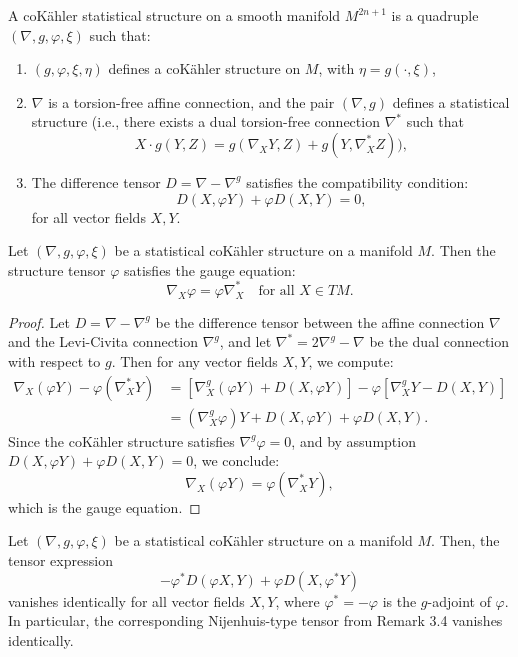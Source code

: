 \begin{defn}
A coKähler statistical structure on a smooth manifold $M^{2n+1}$ is a quadruple $(\nabla, g, \varphi, \xi)$ such that:
\begin{enumerate}
    \item \((g, \varphi, \xi, \eta)\) defines a coKähler structure on \(M\), with \(\eta = g(\cdot, \xi)\),
    \item \(\nabla\) is a torsion-free affine connection, and the pair \((\nabla, g)\) defines a statistical structure (i.e., there exists a dual torsion-free connection \(\nabla^*\) such that
    \[
    X \cdot g(Y, Z) = g(\nabla_X Y, Z) + g(Y, \nabla^*_X Z)),
    \]
    \item The difference tensor \(D = \nabla - \nabla^{g}\) satisfies the compatibility condition:
    \[
    D(X, \varphi Y) + \varphi D(X, Y) = 0,
    \]
    for all vector fields \(X, Y\).
\end{enumerate}
\end{defn}
\begin{prop}
Let \((\nabla, g, \varphi, \xi)\) be a statistical coKähler structure on a manifold \(M\).
Then the structure tensor \(\varphi\) satisfies the gauge equation:
\[
\nabla_X \varphi = \varphi \nabla^*_X \quad \text{for all } X \in TM.
\]
\end{prop}
\begin{proof}
Let \(D = \nabla - \nabla^{g}\) be the difference tensor between the affine connection \(\nabla\) and the Levi-Civita connection \(\nabla^{g}\), and let \(\nabla^* = 2\nabla^{g} - \nabla\) be the dual connection with respect to \(g\). Then for any vector fields \(X, Y\), we compute:
\[
\begin{aligned}
\nabla_X(\varphi Y) - \varphi(\nabla^*_X Y)
&= \left[\nabla^{g}_X(\varphi Y) + D(X, \varphi Y)\right] - \varphi\left[\nabla^{g}_X Y - D(X, Y)\right] \\
&= (\nabla^{g}_X \varphi)Y + D(X, \varphi Y) + \varphi D(X, Y).
\end{aligned}
\]
Since the coKähler structure satisfies \(\nabla^{g} \varphi = 0\), and by assumption \(D(X, \varphi Y) + \varphi D(X, Y) = 0\), we conclude:
\[
\nabla_X(\varphi Y) = \varphi(\nabla^*_X Y),
\]
which is the gauge equation.
\end{proof}
\begin{prop}
Let \((\nabla, g, \varphi, \xi)\) be a statistical coKähler structure on a manifold \(M\).
Then, the tensor expression
\[
-\varphi^* D(\varphi X, Y) + \varphi D(X, \varphi^* Y)
\]
vanishes identically for all vector fields \(X, Y\), where \(\varphi^* = -\varphi\) is the \(g\)-adjoint of \(\varphi\). In particular, the corresponding Nijenhuis-type tensor from Remark 3.4 vanishes identically.
\end{prop}
